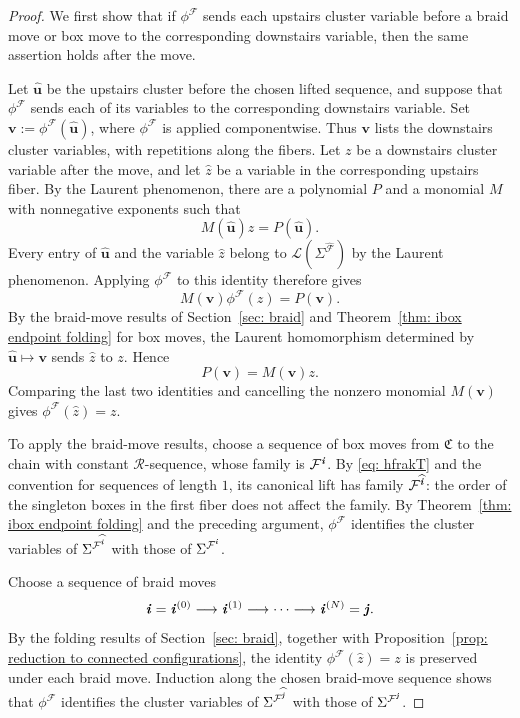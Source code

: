\documentclass[12pt, leqno]{amsart}
\numberwithin{equation}{section}
\theoremstyle{plain}
\theoremstyle{definition}
\newcommand{\seteq}{\mathbin{:=}}
\newcommand{\ii}{ \textbf{\textit{i}}}
\newcommand{\jj}{ \textbf{\textit{j}}}
\newcommand{\hz}{\widehat{z}}
\newcommand{\hii}{{\widehat{\ii}}}
\newcommand{\hjj}{{\widehat{\jj}}}
\newcommand{\frakC}{\mathfrak{C}}
\newcommand{\bfu}{\mathbf{u}}
\newcommand{\bfv}{\mathbf{v}}
\newcommand{\calF}{\mathcal{F}}
\newcommand{\calL}{\mathcal{L}}
\newcommand{\calR}{\mathcal{R}}
\newcommand{\hcalF}{{\widehat{\calF}}}
\begin{document}
\begin{proof}
 We first show that if $\phi^\calF$ sends each upstairs cluster variable
before a braid move or box move to the corresponding
downstairs variable, then the same assertion holds after the move.{}

 Let $\widehat{\bfu}$ be the upstairs cluster before the chosen
lifted sequence, and suppose that $\phi^\calF$ sends each of its
variables to the corresponding downstairs variable.  Set
$\bfv\seteq\phi^\calF(\widehat{\bfu})$, where
$\phi^\calF$ is applied componentwise.  Thus $\bfv$ lists the downstairs cluster variables, with repetitions
along the fibers. Let $z$ be a downstairs cluster variable after the
move, and let $\hz$ be a variable in the corresponding upstairs fiber.  By the Laurent phenomenon, there are a polynomial $P$
and a monomial $M$ with nonnegative exponents such that
\[
M(\widehat{\bfu})\hz=P(\widehat{\bfu}).
\]
Every entry of $\widehat{\bfu}$ and the variable $\hz$ belong
to $\calL(\Sigma^\hcalF)$ by the Laurent phenomenon. Applying
$\phi^\calF$ to this identity therefore gives
\[
M(\bfv)\phi^\calF(\hz)=P(\bfv).
\]
By the braid-move results of Section~\ref{sec: braid} and
Theorem~\ref{thm: ibox endpoint folding} for box moves,  the Laurent homomorphism determined by
$\widehat{\bfu}\mapsto\bfv$ sends $\hz$ to $z$.
Hence
\[
P(\bfv)=M(\bfv)z.
\]
Comparing the last two identities and cancelling the nonzero
monomial $M(\bfv)$ gives $\phi^\calF(\hz)=z$.



To apply the braid-move results, choose a sequence of box moves
from $\frakC$ to the chain with constant $\calR$-sequence, whose
family is $\calF^\ii$.
By \eqref{eq: hfrakT} and the convention for sequences of length
$1$, its canonical lift has family $\calF^\hii$: the order of the
singleton boxes in the first fiber does not affect the family.
By Theorem~\ref{thm: ibox endpoint folding} and the preceding
argument, $\phi^\calF$ identifies the cluster variables of
$\Sigma^{\calF^\hii}$ with those of $\Sigma^{\calF^\ii}$.


Choose a sequence of braid moves
\[
\ii=\ii^{(0)} \longrightarrow \ii^{(1)} \longrightarrow \cdots \longrightarrow \ii^{(N)}=\jj.
\]
By the folding results of Section~\ref{sec: braid}, together
with Proposition~\ref{prop: reduction to connected configurations},
 the identity $\phi^\calF(\hz)=z$ is preserved{} 
 under each braid move.
Induction along the chosen
braid-move sequence shows that $\phi^\calF$ identifies the cluster
variables of  $\Sigma^{\calF^\hjj}$ with those of $\Sigma^{\calF^\jj}${}.


\end{proof}
\end{document}
